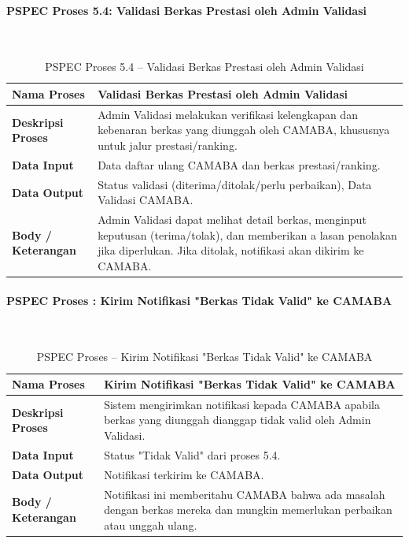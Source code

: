 \paragraph{PSPEC Proses 5.4: Validasi Berkas Prestasi oleh Admin Validasi}~\\
\begin{longtable}{|p{}|p{}|}
	\caption{PSPEC Proses 5.4 -- Validasi Berkas Prestasi oleh Admin Validasi}
	\label{table:3.pspec54}\\
	\hline
	\textbf{Nama Proses} & Validasi Berkas Prestasi oleh Admin Validasi \\
	\hline
	\textbf{Deskripsi Proses} & Admin Validasi melakukan verifikasi kelengkapan dan kebenaran berkas yang diunggah oleh CAMABA, khususnya untuk jalur prestasi/ranking. \\
	\hline
	\textbf{Data Input} & Data daftar ulang CAMABA dan berkas prestasi/ranking. \\
	\hline
	\textbf{Data Output} & Status validasi (diterima/ditolak/perlu perbaikan), Data Validasi CAMABA. \\
	\hline
	\textbf{Body / Keterangan} & Admin Validasi dapat melihat detail berkas, menginput keputusan (terima/tolak), dan memberikan a lasan penolakan jika diperlukan. Jika ditolak, notifikasi akan dikirim ke CAMABA. \\
	\hline
\end{longtable}


\paragraph{PSPEC Proses : Kirim Notifikasi "Berkas Tidak Valid" ke CAMABA}~\\
\begin{longtable}{|p{}|p{}|}
	\caption{PSPEC Proses  -- Kirim Notifikasi "Berkas Tidak Valid" ke CAMABA}
	\label{table:3.pspec}\\
	\hline
	\textbf{Nama Proses} & Kirim Notifikasi "Berkas Tidak Valid" ke CAMABA \\
	\hline
	\textbf{Deskripsi Proses} & Sistem mengirimkan notifikasi kepada CAMABA apabila berkas yang diunggah dianggap tidak valid oleh Admin Validasi. \\
	\hline
	\textbf{Data Input} & Status "Tidak Valid" dari proses 5.4. \\
	\hline
	\textbf{Data Output} & Notifikasi terkirim ke CAMABA. \\
	\hline
	\textbf{Body / Keterangan} & Notifikasi ini memberitahu CAMABA bahwa ada masalah dengan berkas mereka dan mungkin memerlukan perbaikan atau unggah ulang. \\
	\hline
\end{longtable}


